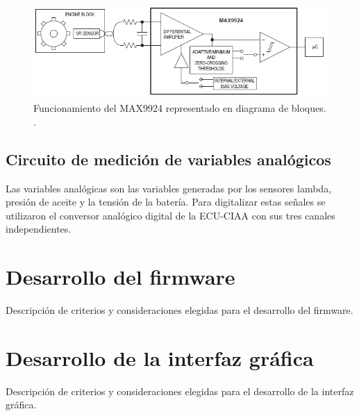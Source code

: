 \break

\begin{figure}[htpb]
\centering
\includegraphics[width=.9\textwidth]{./Figures/max9924.png}
\caption{Funcionamiento del MAX9924 representado en diagrama de bloques. \protect\footnotemark[3].}
\label{fig:motor-combustion}
\end{figure}


\subsection{Circuito de medición de variables analógicos}

Las variables analógicas son las variables generadas por los sensores lambda, presión de aceite y la tensión de la batería. Para digitalizar estas señales se utilizaron el conversor analógico digital de la ECU-CIAA con sus tres canales independientes.

\section{Desarrollo del firmware}

Descripción de criterios y consideraciones elegidas para el desarrollo del firmware.

\section{Desarrollo de la interfaz gráfica}

Descripción de criterios y consideraciones elegidas para el desarrollo de la interfaz gráfica.

